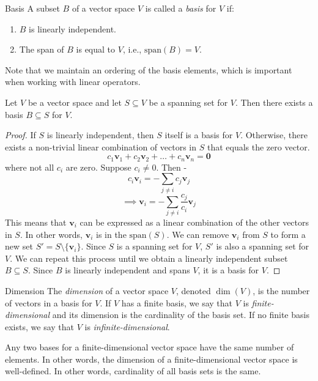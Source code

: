 \documentclass[openany]{book}
\begin{document}
\begin{mydefinition}{Basis}
    A subset $B$ of a vector space $V$ is called a \emph{basis} for $V$ if:
    \begin{enumerate}
        \item $B$ is linearly independent.
        \item The span of $B$ is equal to $V$, i.e., $\text{span}(B) = V$.
    \end{enumerate}
    Note that we maintain an ordering of the basis elements, which is important when working with linear operators. 
\end{mydefinition}
\begin{mytheorem}
    Let $V$ be a vector space and let $S \subseteq V$ be a spanning set for $V$. Then there exists a basis $B \subseteq S$ for $V$.
\end{mytheorem}
\begin{proof}
    If $S$ is linearly independent, then $S$ itself is a basis for $V$. Otherwise, there exists a non-trivial linear combination of vectors in $S$ that equals the zero vector. 
    $$c_1 \mathbf{v}_1 + c_2 \mathbf{v}_2 + \ldots + c_n \mathbf{v}_n = \mathbf{0}$$
    where not all $c_i$ are zero. Suppose $c_i \neq 0$. Then - 
    $$c_i\mathbf{v}_i = -\sum_{j \neq i} c_j \mathbf{v}_j$$
    $$\implies \mathbf{v}_i = -\sum_{j \neq i} \frac{c_j}{c_i} \mathbf{v}_j$$
    This means that $\mathbf{v}_i$ can be expressed as a linear combination of the other vectors in $S$. In other words, $\mathbf{v}_i$ is in the $\text{span}(S)$. We can remove $\mathbf{v}_i$ from $S$ to form a new set $S' = S \setminus \{\mathbf{v}_i\}$. Since $S$ is a spanning set for $V$, $S'$ is also a spanning set for $V$. We can repeat this process until we obtain a linearly independent subset $B \subseteq S$. Since $B$ is linearly independent and spans $V$, it is a basis for $V$.
\end{proof}
\begin{mydefinition}{Dimension}
    The \emph{dimension} of a vector space $V$, denoted $\dim(V)$, is the number of vectors in a basis for $V$. If $V$ has a finite basis, we say that $V$ is \emph{finite-dimensional} and its dimension is the cardinality of the basis set. If no finite basis exists, we say that $V$ is \emph{infinite-dimensional}.
\end{mydefinition}
\begin{mytheorem}
    Any two bases for a finite-dimensional vector space have the same number of elements. In other words, the dimension of a finite-dimensional vector space is well-defined. In other words, cardinality of all basis sets is the same.
\end{mytheorem}
\end{document}

